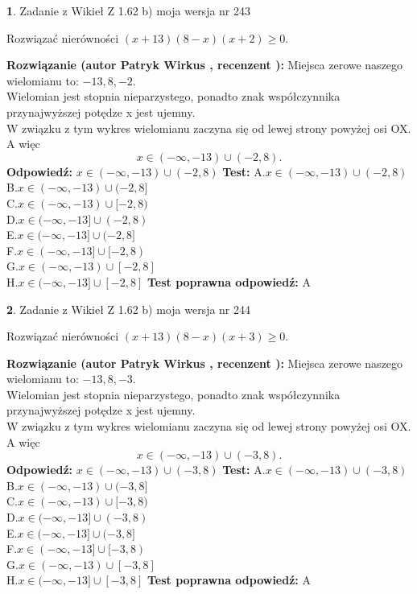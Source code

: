 \documentclass[12pt, a4paper]{article}
\theoremstyle{definition} %
\newtheorem{zad}{}
\newcommand{\zadStart}[1]{\begin{zad}#1\newline}
\newcommand{\zadStop}{\end{zad}}
\newcommand{\rozwStart}[2]{\noindent \textbf{Rozwiązanie (autor #1 , recenzent #2): }\newline}
\newcommand{\rozwStop}{\newline}
\newcommand{\odpStart}{\noindent \textbf{Odpowiedź:}\newline}
\newcommand{\odpStop}{\newline}
\newcommand{\testStart}{\noindent \textbf{Test:}\newline}
\newcommand{\testStop}{\newline}
\newcommand{\kluczStart}{\noindent \textbf{Test poprawna odpowiedź:}\newline}
\newcommand{\kluczStop}{\newline}
\begin{document}
\zadStart{Zadanie z Wikieł Z 1.62 b) moja wersja nr 243}

Rozwiązać nierówności $(x+13)(8-x)(x+2)\ge0$.
\zadStop
\rozwStart{Patryk Wirkus}{}
Miejsca zerowe naszego wielomianu to: $-13, 8, -2$.\\
Wielomian jest stopnia nieparzystego, ponadto znak współczynnika przy\linebreak najwyższej potędze x jest ujemny.\\ W związku z tym wykres wielomianu zaczyna się od lewej strony powyżej osi OX. A więc $$x \in (-\infty,-13) \cup (-2,8).$$
\rozwStop
\odpStart
$x \in (-\infty,-13) \cup (-2,8)$
\odpStop
\testStart
A.$x \in (-\infty,-13) \cup (-2,8)$\\
B.$x \in (-\infty,-13) \cup (-2,8]$\\
C.$x \in (-\infty,-13) \cup [-2,8)$\\
D.$x \in (-\infty,-13] \cup (-2,8)$\\
E.$x \in (-\infty,-13] \cup (-2,8]$\\
F.$x \in (-\infty,-13] \cup [-2,8)$\\
G.$x \in (-\infty,-13) \cup [-2,8]$\\
H.$x \in (-\infty,-13] \cup [-2,8]$
\testStop
\kluczStart
A
\kluczStop



\zadStart{Zadanie z Wikieł Z 1.62 b) moja wersja nr 244}

Rozwiązać nierówności $(x+13)(8-x)(x+3)\ge0$.
\zadStop
\rozwStart{Patryk Wirkus}{}
Miejsca zerowe naszego wielomianu to: $-13, 8, -3$.\\
Wielomian jest stopnia nieparzystego, ponadto znak współczynnika przy\linebreak najwyższej potędze x jest ujemny.\\ W związku z tym wykres wielomianu zaczyna się od lewej strony powyżej osi OX. A więc $$x \in (-\infty,-13) \cup (-3,8).$$
\rozwStop
\odpStart
$x \in (-\infty,-13) \cup (-3,8)$
\odpStop
\testStart
A.$x \in (-\infty,-13) \cup (-3,8)$\\
B.$x \in (-\infty,-13) \cup (-3,8]$\\
C.$x \in (-\infty,-13) \cup [-3,8)$\\
D.$x \in (-\infty,-13] \cup (-3,8)$\\
E.$x \in (-\infty,-13] \cup (-3,8]$\\
F.$x \in (-\infty,-13] \cup [-3,8)$\\
G.$x \in (-\infty,-13) \cup [-3,8]$\\
H.$x \in (-\infty,-13] \cup [-3,8]$
\testStop
\kluczStart
A
\kluczStop
\end{document}
